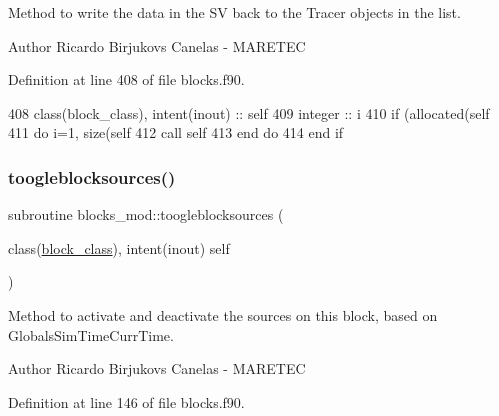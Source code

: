Method to write the data in the SV back to the Tracer objects in the list. 

\begin{DoxyAuthor}{Author}
Ricardo Birjukovs Canelas -\/ M\+A\+R\+E\+T\+EC 
\end{DoxyAuthor}


Definition at line 408 of file blocks.\+f90.


\begin{DoxyCode}
408     \textcolor{keywordtype}{class}(block\_class), \textcolor{keywordtype}{intent(inout)} :: self
409     \textcolor{keywordtype}{integer} :: i
410     \textcolor{keywordflow}{if} (\textcolor{keyword}{allocated}(self%
411         \textcolor{keywordflow}{do} i=1, \textcolor{keyword}{size}(self%
412             \textcolor{keyword}{call }self%
413 \textcolor{keywordflow}{        end do}
414 \textcolor{keywordflow}{    end if}
\end{DoxyCode}
\mbox{\label{namespaceblocks__mod_ab9e57cbf0103b632b2b2dfa4e4d4139c}} 
\subsubsection{\texorpdfstring{toogleblocksources()}{toogleblocksources()}}
{\footnotesize\ttfamily subroutine blocks\+\_\+mod\+::toogleblocksources (\begin{DoxyParamCaption}\item[{class(\mbox{\hyperlink{structblocks__mod_1_1block__class}{block\+\_\+class}}), intent(inout)}]{self }\end{DoxyParamCaption})\hspace{0.3cm}{\ttfamily [private]}}



Method to activate and deactivate the sources on this block, based on GlobalsSim\+TimeCurr\+Time. 

\begin{DoxyAuthor}{Author}
Ricardo Birjukovs Canelas -\/ M\+A\+R\+E\+T\+EC 
\end{DoxyAuthor}


Definition at line 146 of file blocks.\+f90.


